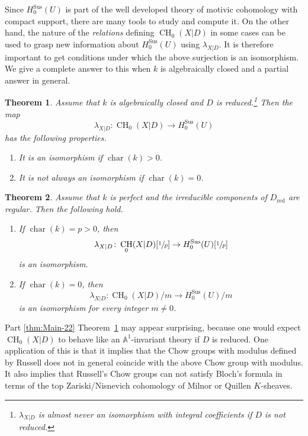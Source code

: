 \documentclass[11pt]{article}
\numberwithin{equation}{section}
\newcommand{\sus}{\mathrm{Sus}}
\newtheorem{thm}{Theorem}[section]
\theoremstyle{definition}
\newcommand{\thmref}{Theorem~\ref}
\newcommand{\A}{{\mathbb A}}
\DeclareMathOperator{\CH}{CH}
\DeclareMathOperator{\Char}{char}
\newcommand{\red}{\mathrm{red}}
\begin{document}
Since $H^{\sus}_0(U)$ is part of the well developed theory of
motivic cohomology with compact support, there are many tools
to study and compute it. On the other hand, the nature of the \emph{relations}
defining $\CH_0(X|D)$ in some cases
can be used to grasp new information about $H^{\sus}_0(U)$ using $\lambda_{X|D}$.
It is therefore important to get conditions under which the above surjection is an
isomorphism.
We give a complete answer to this when $k$ is algebraically closed and
a partial answer in general.

\begin{thm}\label{thm:Main-2}
Assume that $k$ is algebraically closed and $D$ is
reduced.\footnote{$\lambda_{X|D}$ is almost never an
isomorphism with integral coefficients if $D$ is not reduced.} Then the map
\[
\lambda_{X|D} \colon \CH_0(X|D) \to H^{\sus}_0(U)
\]
has the following properties.
\begin{enumerate}
\item\label{thm:Main-21}
It is an isomorphism if $\Char(k) > 0$.
\item\label{thm:Main-22}
It is not always an isomorphism if $\Char(k) = 0$.
\end{enumerate}
\end{thm}

\begin{thm}\label{thm:Main-2-fin}
Assume that $k$ is perfect and the irreducible components of $D_\red$ are regular.
Then the following hold.
\begin{enumerate}
\item\label{thm:Main-2-fin1}
If $\Char(k) = p > 0$, then
\[
\lambda_{X|D} \colon \CH_0(X|D)[\sfrac{1}{p}] \to H^{\sus}_0(U)[\sfrac{1}{p}]
\]
is an isomorphism.
\item\label{thm:Main-2-fin2}
If $\Char(k) = 0$, then
\[
\lambda_{X|D} \colon {\CH_0(X|D)}/m \to {H^{\sus}_0(U)}/m
\]
is an isomorphism for every integer $m \neq 0$.
\end{enumerate}
\end{thm}

Part \eqref{thm:Main-22} \thmref{thm:Main-2} may appear surprising, because one would expect
$\CH_0(X|D)$ to behave like an $\A^1$-invariant theory if $D$ is reduced.
One application of this is that it implies that
the Chow groups with modulus defined by Russell \cite{RussellANT} does
not in general coincide with the above Chow group with modulus.
It also implies that Russell's Chow groups can not satisfy Bloch's formula
in terms of the top Zariski/Nisnevich cohomology of Milnor or Quillen
$K$-sheaves.
\end{document}
